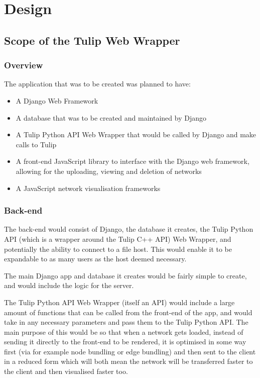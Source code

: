 \documentclass[../dissertation.tex]{subfiles}
\begin{document}
\chapter{Design}

\section{Scope of the Tulip Web Wrapper}
\label{sec:scope}

\subsection{Overview}

The application that was to be created was planned to have:

\begin{itemize}
    \item A Django Web Framework
    \item A database that was to be created and maintained by Django
    \item A Tulip Python API Web Wrapper that would be called by Django and make calls to Tulip
    \item A front-end JavaScript library to interface with the Django web framework, allowing for the uploading, viewing and deletion of networks
    \item A JavaScript network visualisation frameworks
\end{itemize}

\subsection{Back-end}

The back-end would consist of Django, the database it creates, the Tulip Python API (which is a wrapper around the Tulip C++ API) Web Wrapper, and potentially the ability to connect to a file host. This would enable it to be expandable to as many users as the host deemed necessary.

The main Django app and database it creates would be fairly simple to create, and would include the logic for the server.

The Tulip Python API Web Wrapper (itself an API) would include a large amount of functions that can be called from the front-end of the app, and would take in any necessary parameters and pass them to the Tulip Python API. The main purpose of this would be so that when a network gets loaded, instead of sending it directly to the front-end to be rendered, it is optimised in some way first (via for example node bundling or edge bundling) and then sent to the client in a reduced form which will both mean the network will be transferred faster to the client and then visualised faster too. 
\end{document}
